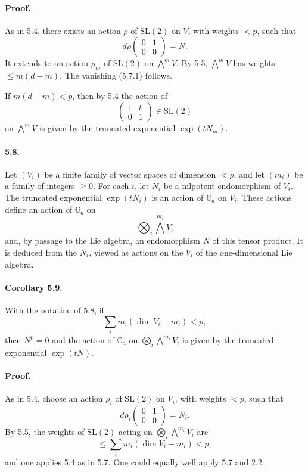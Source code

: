 \documentclass[11pt]{article}
\newcommand{\Ga}{\mathbb{G}_a}
\theoremstyle{plain}
\theoremstyle{definition}
\begin{document}
\paragraph{Proof.} As in 5.4, there exists an action $\rho$ of $\mathrm{SL}(2)$ on $V$, with weights $<p$, such that
\[
   d\rho\begin{pmatrix}0&1\\0&0\end{pmatrix}=N.
\]
It extends to an action $\rho_m$ of $\mathrm{SL}(2)$ on $\bigwedge^m V$. By 5.5, $\bigwedge^m V$ has weights $\le m(d-m)$. The vanishing (5.7.1) follows.

If $m(d-m)<p$, then by 5.4 the action of
\[
   \begin{pmatrix}1&t\\0&1\end{pmatrix}\in\mathrm{SL}(2)
\]
on $\bigwedge^m V$ is given by the truncated exponential $\exp(tN_m)$.

\paragraph{5.8.} Let $(V_i)$ be a finite family of vector spaces of dimension $<p$, and let $(m_i)$ be a family of integers $\ge0$. For each $i$, let $N_i$ be a nilpotent endomorphism of $V_i$. The truncated exponential $\exp(tN_i)$ is an action of $\Ga$ on $V_i$. These actions define an action of $\Ga$ on
\[
   \bigotimes_i \bigwedge^{m_i}V_i
\]
and, by passage to the Lie algebra, an endomorphism $N$ of this tensor product. It is deduced from the $N_i$, viewed as actions on the $V_i$ of the one-dimensional Lie algebra.

\paragraph{Corollary 5.9.} With the notation of 5.8, if
\begin{equation}\tag{5.9.1}
   \sum_i m_i(\dim V_i-m_i)<p,
\end{equation}
then $N^p=0$ and the action of $\Ga$ on $\bigotimes_i\bigwedge^{m_i}V_i$ is given by the truncated exponential $\exp(tN)$.

\paragraph{Proof.} As in 5.4, choose an action $\rho_i$ of $\mathrm{SL}(2)$ on $V_i$, with weights $<p$, such that
\[
   d\rho_i\begin{pmatrix}0&1\\0&0\end{pmatrix}=N_i.
\]
By 5.5, the weights of $\mathrm{SL}(2)$ acting on $\bigotimes_i\bigwedge^{m_i}V_i$ are
\[
   \le \sum_i m_i(\dim V_i-m_i)<p,
\]
and one applies 5.4 as in 5.7. One could equally well apply 5.7 and 2.2.
\end{document}
